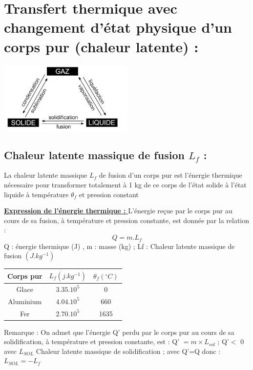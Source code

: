 \documentclass[12pt]{article}
\begin{document}
\section{Transfert thermique avec changement d'état physique d'un corps pur (chaleur latente) : }
\begin{center}

   \includegraphics[width=0.5\textwidth]{./img/img01.jpg}
\end{center}




\subsection{Chaleur latente massique de fusion $L_f$ : }

La chaleur latente massique $L_f$ de fusion d'un corps pur est l'énergie thermique
nécessaire pour transformer totalement à 1 kg de ce corps de l'état solide à l'état
liquide à température $\theta_f$ et pression constant

\underline{\textbf{Expression de l'énergie thermique : }}L'énergie reçue par le corps pur au cours de sa fusion, à température et pression
constante, est donnée par la relation : $$Q = m.L_f$$
Q : énergie thermique (J) , m : masse (kg) ; Lf : Chaleur latente massique de fusion $(J.kg^{-1})$
\begin{center}
\begin{tabular}{|c|c|c|}
    \hline
    Corps pur &$L_f(j.kg^{-1})$ &$\theta_f(^{\circ}C)$\\\hline
    Glace     & $3.35.10^5$ & 0 \\\hline
    Aluminium & $4.04.10^5$ & 660\\\hline
    Fer       & $2.70.10^5$ & 1635\\\hline
    \end{tabular}
\end{center}
Remarque :
On admet que l'énergie Q' perdu par le corps pur au cours de sa solidification, à
température et pression constante, est : Q' $= m × L_{sol}$ ; Q'$<$ 0  avec $L_{SOL}$ Chaleur
latente massique de solidification ; avec Q'=Q  donc : $L_{SOL} = -L_f$
\end{document}
